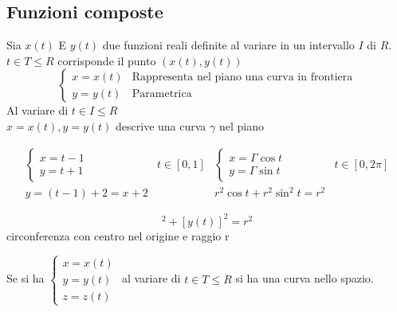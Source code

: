\subsection{Funzioni composte}
\begin{defi}
  Sia $x(t)$ E $y(t)$ due funzioni reali definite al variare in un intervallo $I$ di $R$.
  $t\in T \leq R$ corrisponde il punto $(x(t),y(t))$
  \begin{equation*}
    \begin{cases}
      x=x(t) & \text{Rappresenta nel piano una curva in frontiera}\\
      y=y(t) & \text{Parametrica}
    \end{cases}
  \end{equation*}
  Al variare di $t\in I\leq R$\\
  $x=x(t),y=y(t)$ descrive una curva $\gamma$ nel piano 
\end{defi}
\clearpage
\begin{esempio}
  \begin{equation*}
    \begin{matrix}
    \begin{cases}
        x=t-1\\
        y=t+1
    \end{cases}& t\in [0,1] &
    \begin{cases}
        x=\Gamma \cos t\\
        y=\Gamma \sin t
    \end{cases}& t\in [0,2\pi]\\
      y=(t-1)+2=x+2 && r^2\cos t+ r^2\sin^2t=r^2
    \end{matrix}
  \end{equation*}
  \begin{multicols}{2}
      \begin{equation*}
      	[x(t)]^2+[y(t)]^2=r^2
      \end{equation*}
      circonferenza con centro nel origine e raggio r
    \end{multicols}
    Se si ha $\begin{cases} x=x(t) \\ y=y(t) \\ z=z(t)\end{cases}$ al variare di $t\in T \leq R$ si
    ha una curva nello spazio.
\end{esempio}
